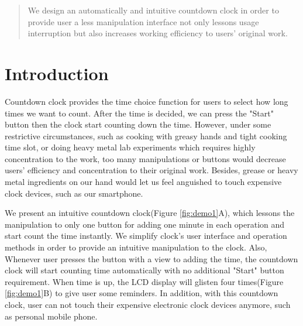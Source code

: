 \documentclass{sig-alternate-ipsn13}
\begin{document}

\maketitle
\begin{abstract}
We design an automatically and intuitive countdown clock in order to provide user a less manipulation interface not only lessons usage interruption but also increases working efficiency to users' original work.

\end{abstract}

\section{Introduction}

Countdown clock provides the time choice function for users to select how long times we want to count. After the time is decided, we can press the "Start" button then the clock start counting down the time. However, under some restrictive circumstances, such as cooking with greasy hands and tight cooking time slot, or doing heavy metal lab experiments which requires highly concentration to the work, too many manipulations or buttons would decrease users' efficiency and concentration to their original work. 
Besides, grease or heavy metal ingredients on our hand would let us feel anguished to touch expensive clock devices, such as our smartphone. 

We present an intuitive countdown clock(Figure \ref{fig:demo1}A), which lessons the manipulation to only one button for adding one minute in each operation and start count the time instantly. We simplify clock's user interface and operation methods in order to provide an intuitive manipulation to the clock. Also, Whenever user presses the button with a view to adding the time, the countdown clock will start counting time automatically with no additional "Start" button requirement. When time is up, the LCD display will glisten four times(Figure \ref{fig:demo1}B) to give user some reminders. In addition, with this countdown clock, user can not touch their expensive electronic clock devices anymore, such as personal mobile phone.
\end{document}
